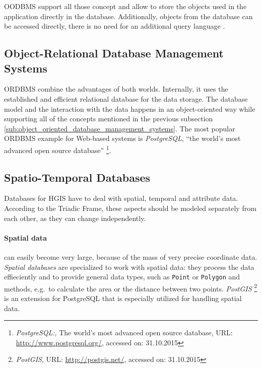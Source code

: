 OODBMS support all those concept and allow to store the objects used in the application directly in the database. Additionally, objects from the database can be accessed directly, there is no need for an additional query language \cite{oodbms}.


\subsection{Object-Relational Database Management Systems} %
\label{sub:object_relational_database_management_systems}

ORDBMS combine the advantages of both worlds. Internally, it uses the established and efficient relational database for the data storage. The database model and the interaction with the data happens in an object-oriented way while supporting all of the concepts mentioned in the previous subsection \ref{sub:object_oriented_database_management_systems}. The most popular ORDBMS example for Web-based systems is \emph{PostgreSQL}, ``the world's most advanced open source database''
\footnote{
  \emph{PostgreSQL:},
  The world's most advanced open source database,
  URL: \url{http://www.postgresql.org/},
  accessed on: 31.10.2015
}.


\subsection{Spatio-Temporal Databases} %
\label{par:spatial_databases}

Databases for HGIS have to deal with spatial, temporal and attribute data. According to the Triadic Frame, these aspects should be modeled separately from each other, as they can change independently.

\paragraph{Spatial data} %
\label{par:spatial_data}

can easily become very large, because of the mass of very precise coordinate data. \emph{Spatial databases} are specialized to work with spatial data: they process the data effieciently and to provide general data types, such as \texttt{Point} or \texttt{Polygon} and methods, e.g.\ to calculate the area or the distance between two points. \emph{PostGIS}
\footnote{
  \emph{PostGIS},
  URL: \url{http://postgis.net/},
  accessed on: 31.10.2015
}
is an extension for PostgreSQL that is especially utilized for handling spatial data.

